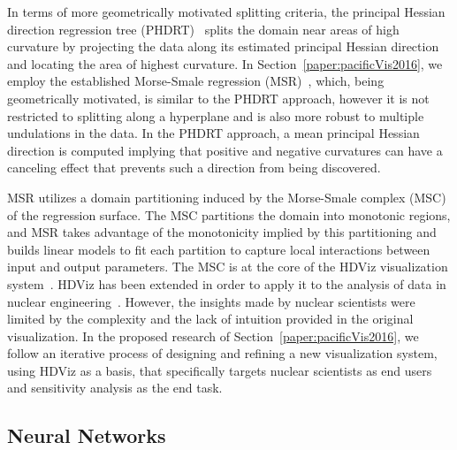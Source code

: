 In terms of more geometrically motivated splitting criteria, the principal Hessian direction regression tree (PHDRT)~\cite{LiLueChen2000} splits the domain near areas of high curvature by projecting the data along its estimated principal Hessian direction and locating the area of highest curvature.
%
In Section~\ref{paper:pacificVis2016}, we employ the established Morse-Smale regression (MSR)~\cite{GerberRubelBremer2011}, which, being geometrically motivated, is similar to the PHDRT approach, however it is not restricted to splitting along a hyperplane and is also more robust to multiple undulations in the data.
%
In the PHDRT approach, a mean principal Hessian direction is computed implying that positive and negative curvatures can have a canceling effect that prevents such a direction from being discovered.

MSR utilizes a domain partitioning induced by the Morse-Smale complex (MSC) of the regression surface.
%
The MSC partitions the domain into monotonic regions, and MSR takes advantage of the monotonicity implied by this partitioning and builds linear models to fit each partition to capture local interactions between input and output parameters.
%
The MSC is at the core of the HDViz visualization system~\cite{GerberBremerPascucci2010}.
%
HDViz has been extended in order to apply it to the analysis of data in nuclear engineering~\cite{MaljovecLiuWang2015,MaljovecWangMandelli2013a,MaljovecWangPascucci2013}.
%
However, the insights made by nuclear scientists were limited by the complexity and the lack of intuition provided in the original visualization.
%
In the proposed research of Section~\ref{paper:pacificVis2016}, we follow an iterative process of designing and refining a new visualization system, using HDViz as a basis, that specifically targets nuclear scientists as end users and sensitivity analysis as the end task.
%

\subsection{Neural Networks}


